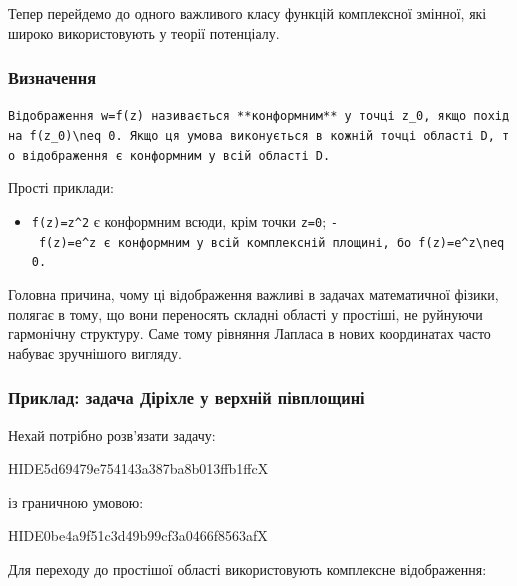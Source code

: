 \documentclass[
  ukrainian,
]{article}
\providecommand{\tightlist}{%
  \setlength{\itemsep}{0pt}\setlength{\parskip}{0pt}}
\begin{document}
Тепер перейдемо до одного важливого класу функцій комплексної змінної,
які широко використовують у теорії потенціалу.

\subsubsection{Визначення}\label{ux432ux438ux437ux43dux430ux447ux435ux43dux43dux44f}

\texttt{Відображення\ \textquotesingle{}w=f(z)\textquotesingle{}\ називається\ **конформним**\ у\ точці\ \textquotesingle{}z\_0\textquotesingle{},\ якщо\ похідна\ \textquotesingle{}f\textquotesingle{}(z\_0)\textbackslash{}neq\ 0\textquotesingle{}.\ Якщо\ ця\ умова\ виконується\ в\ кожній\ точці\ області\ \textquotesingle{}D\textquotesingle{},\ то\ відображення\ є\ конформним\ у\ всій\ області\ \textquotesingle{}D\textquotesingle{}.}

Прості приклади:

\begin{itemize}
\tightlist
\item
  \texttt{f(z)=z\^{}2} є конформним всюди, крім точки \texttt{z=0};
  \texttt{-\ \textquotesingle{}f(z)=e\^{}z\textquotesingle{}\ є\ конформним\ у\ всій\ комплексній\ площині,\ бо\ \textquotesingle{}f\textquotesingle{}(z)=e\^{}z\textbackslash{}neq\ 0\textquotesingle{}.}
\end{itemize}

Головна причина, чому ці відображення важливі в задачах математичної
фізики, полягає в тому, що вони переносять складні області у простіші,
не руйнуючи гармонічну структуру. Саме тому рівняння Лапласа в нових
координатах часто набуває зручнішого вигляду.

\subsubsection{Приклад: задача Діріхле у верхній
півплощині}\label{ux43fux440ux438ux43aux43bux430ux434-ux437ux430ux434ux430ux447ux430-ux434ux456ux440ux456ux445ux43bux435-ux443-ux432ux435ux440ux445ux43dux456ux439-ux43fux456ux432ux43fux43bux43eux449ux438ux43dux456}

Нехай потрібно розв'язати задачу:

HIDE5d69479e754143a387ba8b013ffb1ffcX

із граничною умовою:

HIDE0be4a9f51c3d49b99cf3a0466f8563afX

Для переходу до простішої області використовують комплексне
відображення:
\end{document}
